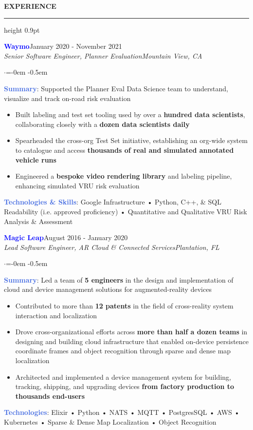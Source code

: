 \documentclass[
    11pt, %
]{resume} %
\newenvironment{rSectionCustom}[1]{
  \Large
  \sectionskip
  \textbf{\textcolor{Cerulean}{\MakeUppercase{#1}}}
  \vspace{0.5em}
  {\color{Blue}\hrule height 0.9pt}
  \vspace{0.25em}

  \begin{list}{}{
    \setlength{\leftmargin}{1.5em}
  }
  \item[]
}{
    \vspace{1em}
    \end{list}
}
\newenvironment{rSubsection2}[4]{
  \normalsize
  \hspace{-18pt}\textcolor{Blue}{\textbf{\large #1}}\hfill{#2}
  \\
  \hspace*{-18pt}\emph{#3}\hfill\emph{#4}
  \begin{list}{$\cdot$}{\leftmargin=-0em}
  \itemsep -0.5em \vspace{-0.25em}
}{
    \vspace{1em}
    \end{list}
}
\begin{document}
\begin{rSectionCustom}{Experience}
    \begin{rSubsection2}{Waymo}{January 2020 - November 2021}{Senior Software Engineer, Planner Evaluation}{Mountain View, CA}
        \item[] \textcolor{RoyalBlue}{\textbf{Summary}}: Supported the Planner Eval Data Science team to understand, visualize and track on-road risk evaluation
        \begin{itemize}[leftmargin=*]
            \item Built labeling and test set tooling used by over a \textbf{hundred data scientists}, collaborating closely with a \textbf{dozen data scientists daily}
            \item Spearheaded the cross-org Test Set initiative, establishing an org-wide system to catalogue and access \textbf{thousands of real and simulated annotated vehicle runs}
            \item Engineered a \textbf{bespoke video rendering library} and labeling pipeline, enhancing simulated VRU risk evaluation
        \end{itemize}
        \vspace{0.5em}
        \item[] \textcolor{RoyalBlue}{\textbf{Technologies \& Skills}}: Google Infrastructure • Python, C++, \& SQL Readability (i.e. approved proficiency) • Quantitative and Qualitative VRU Risk Analysis \& Assessment
    \end{rSubsection2}

    \begin{rSubsection2}{Magic Leap}{August 2016 - January 2020}{Lead Software Engineer, AR Cloud \& Connected Services}{Plantation, FL}
        \item[] \textcolor{RoyalBlue}{\textbf{Summary}}: Led a team of \textbf{5 engineers} in the design and implementation of cloud and device management solutions for augmented-reality devices
        \begin{itemize}[leftmargin=*]
            \item Contributed to more than \textbf{12 patents} in the field of cross-reality system interaction and localization
            \item Drove cross-organizational efforts across \textbf{more than half a dozen teams} in designing and building cloud infrastructure that enabled on-device persistence coordinate frames and object recognition through sparse and dense map localization
            \item Architected and implemented a device management system for building, tracking, shipping, and upgrading devices \textbf{from factory production to thousands end-users}
            \end{itemize}
        \vspace{0.5em}
        \item[] \textcolor{RoyalBlue}{\textbf{Technologies}}: Elixir • Python • NATS • MQTT • PostgresSQL • AWS • Kubernetes • Sparse \& Dense Map Localization • Object Recognition
    \end{rSubsection2}


\end{rSectionCustom}
\end{document}
